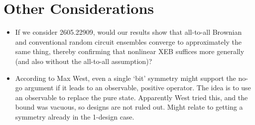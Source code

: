 \documentclass[11pt,reqno]{amsart}
\begin{document}
\section{Other Considerations}
\begin{itemize}
    \item If we consider 2605.22909, would our results show that all-to-all Brownian and conventional random circuit ensembles converge to approximately the same thing, thereby confirming that nonlinear XEB suffices more generally (and also without the all-to-all assumption)?
    \item According to Max West, even a single `bit' symmetry might support the no-go argument if it leads to an observable, positive operator. The idea is to use an observable to replace the pure state. Apparently West tried this, and the bound was vacuous, so designs are not ruled out. Might relate to getting a symmetry already in the 1-design case.
\end{itemize}



\end{document}
